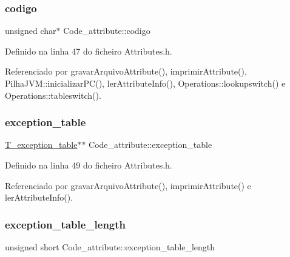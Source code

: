\mbox{\label{structCode__attribute_a7ca728e51c5888fc4a95ec8b14bcab59}} 
\subsubsection{\texorpdfstring{codigo}{codigo}}
{\footnotesize\ttfamily unsigned char$\ast$ Code\+\_\+attribute\+::codigo}



Definido na linha 47 do ficheiro Attributes.\+h.



Referenciado por gravar\+Arquivo\+Attribute(), imprimir\+Attribute(), Pilha\+J\+V\+M\+::inicializar\+P\+C(), ler\+Attribute\+Info(), Operations\+::lookupswitch() e Operations\+::tableswitch().

\mbox{\label{structCode__attribute_a21aaa6b7c7e11176c026c57f78046e05}} 
\subsubsection{\texorpdfstring{exception\+\_\+table}{exception\_table}}
{\footnotesize\ttfamily \hyperlink{structT__exception__table}{T\+\_\+exception\+\_\+table}$\ast$$\ast$ Code\+\_\+attribute\+::exception\+\_\+table}



Definido na linha 49 do ficheiro Attributes.\+h.



Referenciado por gravar\+Arquivo\+Attribute(), imprimir\+Attribute() e ler\+Attribute\+Info().

\mbox{\label{structCode__attribute_ab29373557f9cfffb736fe8d275884c70}} 
\subsubsection{\texorpdfstring{exception\+\_\+table\+\_\+length}{exception\_table\_length}}
{\footnotesize\ttfamily unsigned short Code\+\_\+attribute\+::exception\+\_\+table\+\_\+length}



